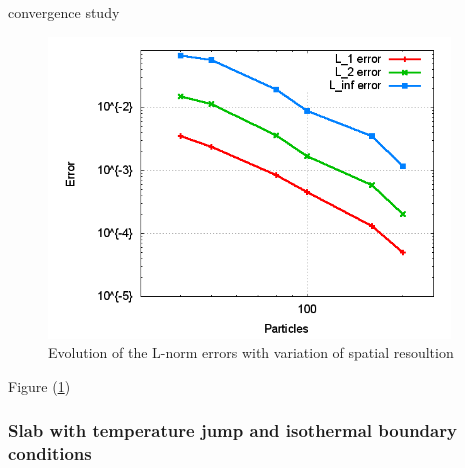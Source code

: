 \documentclass{report}
\begin{document}
convergence study

\begin{figure}[h]  
  \label{fig:PureHeat_ErrorResolution}
  \centering
  \includegraphics[width=0.95\textwidth]{Graphics/results/PureHeatConduction/ErrorResolution}
  \caption{Evolution of the L-norm errors with variation of spatial resoultion}
\end{figure}
Figure (\ref{fig:PureHeat_ErrorResolution})




\subsubsection{Slab with temperature jump and isothermal boundary conditions}
\end{document}
